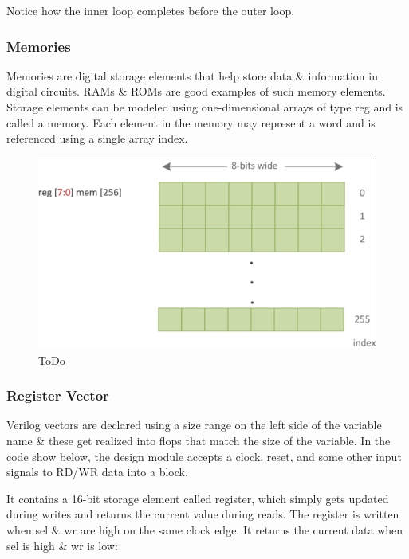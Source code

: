 \documentclass{article}
\begin{document}
	Notice how the inner loop completes before the outer loop.

	\subsubsection{Memories}

	Memories are digital storage elements that help store data \& information in digital circuits. RAMs \& ROMs are good examples of such memory elements. Storage elements can be modeled using one-dimensional
	arrays of type reg and is called a memory. Each element in the memory may represent a word and is referenced using a single array index.

	\begin{figure}[H]
		\includegraphics[width=\linewidth]{VerilogPics/figure_22.png}
		\caption{ToDo}
		\label{ToDo}
	\end{figure}

	\subsubsection{Register Vector}
	Verilog vectors are declared using a size range on the left side of the variable name \& these get realized into flops that match the size of the variable. In the code show below, the design 
	module accepts a clock, reset, and some other input signals to RD/WR data into a block. \newline

	It contains a 16-bit storage element called register, which simply gets updated during writes and returns the current value during reads. The register is written when sel \& wr are high on the same
	clock edge. It returns the current data when sel is high \& wr is low:
\end{document}
